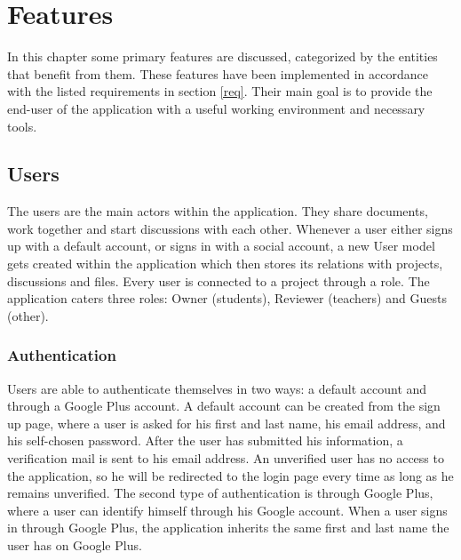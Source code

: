 \chapter{Features}
In this chapter some primary features are discussed, categorized by the entities that benefit from them. These features have been implemented in accordance with the listed requirements in section \ref{req}. Their main goal is to provide the end-user of the application with a useful working environment and necessary tools.

\section{Users}
The users are the main actors within the application. They share documents, work together and start discussions with each other. Whenever a user either signs up with a default account, or signs in with a social account, a new User model gets created within the application which then stores its relations with projects, discussions and files. Every user is connected to a project through a role. The application caters three roles: Owner (students), Reviewer (teachers) and Guests (other).

\subsection{Authentication}
Users are able to authenticate themselves in two ways: a default account and through a Google Plus account. A default account can be created from the sign up page, where a user is asked for his first and last name, his email address, and his self-chosen password. After the user has submitted his information, a verification mail is sent to his email address. An unverified user has no access to the application, so he will be redirected to the login page every time as long as he remains unverified. The second type of authentication is through Google Plus, where a user can identify himself through his Google account. When a user signs in through Google Plus, the application inherits the same first and last name the user has on Google Plus.

